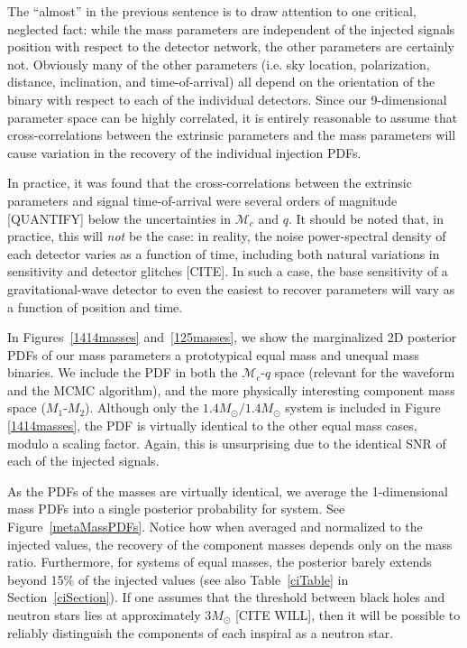 \documentclass[11pt,a4paper]{emulateapj}
\newcommand{\carl}[1]{{\color{red}  #1}}
\newcommand{\chmass}{\mathcal{M}_c}
\begin{document}
The ``almost'' in the previous sentence is to draw attention to one critical, neglected fact: while the mass parameters are independent of the injected signals position with respect to the detector network, the other parameters are certainly not.  Obviously many of the other parameters (i.e. sky location, polarization, distance, inclination, and time-of-arrival) all depend on the orientation of the binary with respect to each of the individual detectors.  Since our 9-dimensional parameter space can be highly correlated, it is entirely reasonable to assume that cross-correlations between the extrinsic parameters and the mass parameters will cause variation in the recovery of the individual injection PDFs.  

In practice, it was found that the cross-correlations between the extrinsic parameters and signal time-of-arrival were several orders of magnitude \carl{[QUANTIFY]} below the uncertainties in $\chmass$ and $q$.  It should be noted that, in practice, this will \emph{not} be the case: in reality, the noise power-spectral density of each detector varies as a function of time, including both natural variations in sensitivity and detector glitches \carl{[CITE]}.  In such a case, the base sensitivity of a gravitational-wave detector to even the easiest to recover parameters will vary as a function of position and time.  

In Figures~\ref{1414masses} and~\ref{125masses}, we show the marginalized 2D posterior PDFs of our mass parameters a prototypical equal mass and unequal mass binaries.  We include the PDF in both the $\chmass$-$q$ space (relevant for the waveform and the MCMC algorithm), and the more physically interesting component mass space ($M_1$-$M_2$).  Although only the $1.4M_{\odot}/1.4M_{\odot}$ system is included in Figure \ref{1414masses}, the PDF is virtually identical to the other equal mass cases, modulo a scaling factor.  Again, this is unsurprising due to the identical SNR of each of the injected signals.   

As the PDFs of the masses are virtually identical, we average the 1-dimensional mass PDFs into a single posterior probability for
system.  See Figure~\ref{metaMassPDFs}.  Notice how when averaged and normalized to the injected values, the recovery of the component masses depends only on the mass ratio.  Furthermore, for systems of equal masses, the posterior barely extends beyond 15\% of the injected values (see also Table~\ref{ciTable} in Section~\ref{ciSection}).  If one assumes that the threshold between black holes and neutron stars lies at approximately $3M_{\odot}$ \carl{[CITE WILL]}, then it will be possible to reliably distinguish the components of each inspiral as a neutron star. 
\end{document}
